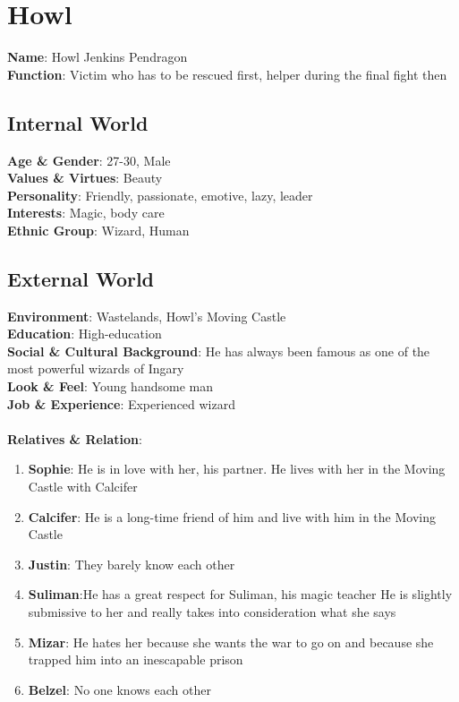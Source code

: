 \section{Howl}

\textbf{Name}: Howl Jenkins Pendragon \\
\textbf{Function}: Victim who has to be rescued first, helper during the final fight then

\subsection{Internal World}

\textbf{Age \& Gender}: 27-30, Male \\
\textbf{Values \& Virtues}: Beauty \\
\textbf{Personality}: Friendly, passionate, emotive, lazy, leader \\
\textbf{Interests}: Magic, body care \\
\textbf{Ethnic Group}: Wizard, Human

\subsection{External World}
\textbf{Environment}: Wastelands, Howl’s Moving Castle \\
\textbf{Education}: High-education \\
\textbf{Social \& Cultural Background}: He has always been famous as one of the most powerful wizards of Ingary \\
\textbf{Look \& Feel}: Young handsome man   \\
\textbf{Job \& Experience}: Experienced wizard \\
\\
\textbf{Relatives \& Relation}:
\begin{enumerate}
\item \textbf{Sophie}: He is in love with her, his partner. He lives with her in the Moving Castle
        with Calcifer
\item \textbf{Calcifer}: He is a long-time friend of him and live with him in the Moving Castle
\item \textbf{Justin}: They barely know each other
\item \textbf{Suliman}:He has a great respect for Suliman, his magic teacher
             He is slightly submissive to her and really takes into consideration what she says
\item \textbf{Mizar}: He hates her because she wants the war to go on and because she trapped him into an inescapable prison 
\item \textbf{Belzel}: No one knows each other
\end{enumerate}

